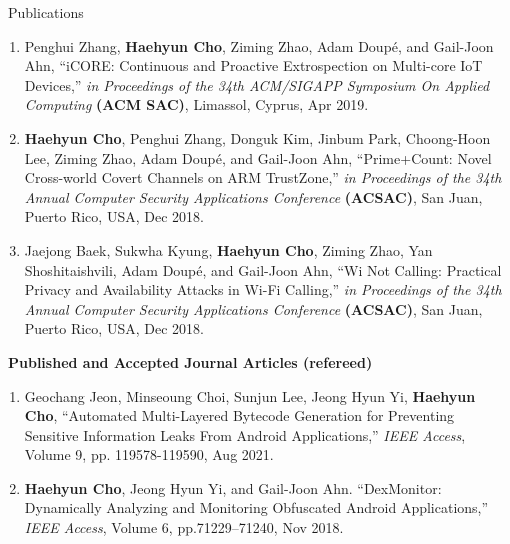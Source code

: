 \documentclass{resume} %
\begin{document}
\begin{rSection}{\faGenderless~Publications}
\begin{enumerate}[leftmargin=0pt]
		\item Penghui Zhang, \textbf{Haehyun Cho}, Ziming Zhao, Adam Doup\'e, and Gail-Joon Ahn,
		``iCORE: Continuous and Proactive Extrospection on Multi-core IoT Devices,'' 
        \emph{in Proceedings of the 34th ACM/SIGAPP Symposium On Applied Computing} \textbf{(ACM SAC)}, 
		Limassol, Cyprus, Apr 2019.
     
        \item \textbf{Haehyun Cho}, Penghui Zhang, Donguk Kim, Jinbum Park, Choong-Hoon Lee, Ziming Zhao, Adam Doup\'e, and Gail-Joon Ahn,
		``Prime+Count: Novel Cross-world Covert Channels on ARM TrustZone,'' 
        \emph{in Proceedings of the 34th Annual Computer Security Applications Conference} \textbf{(ACSAC)}, 
		San Juan, Puerto Rico, USA, Dec 2018.

		\item Jaejong Baek, Sukwha Kyung, \textbf{Haehyun Cho}, Ziming Zhao, Yan Shoshitaishvili, Adam Doup\'e, and Gail-Joon Ahn,
		``Wi Not Calling: Practical Privacy and Availability Attacks in Wi-Fi Calling,'' 
        \emph{in Proceedings of the 34th Annual Computer Security Applications Conference} \textbf{(ACSAC)}, 
		San Juan, Puerto Rico, USA, Dec 2018.

	\end{enumerate}

	\vspace{3mm}
	
    \strut\textbullet~{\bf Published and Accepted Journal Articles (refereed)}
    \begin{enumerate}[leftmargin=0pt]
		
		\item Geochang Jeon, Minseoung Choi, Sunjun Lee, Jeong Hyun Yi, \textbf{Haehyun Cho}, ``Automated Multi-Layered Bytecode Generation for Preventing Sensitive Information Leaks From Android Applications,'' \emph{IEEE Access}, Volume 9, pp. 119578-119590, Aug 2021.
		
		\item \textbf{Haehyun Cho}, Jeong Hyun Yi, and Gail-Joon Ahn.
        ``DexMonitor: Dynamically Analyzing and Monitoring Obfuscated Android Applications,'' 
        \emph{IEEE Access},
        Volume 6, pp.71229--71240, Nov 2018.


\end{enumerate}
\end{rSection}
\end{document}

